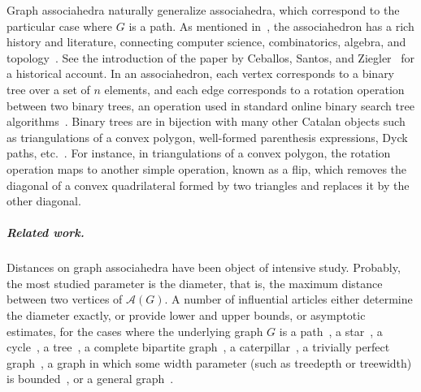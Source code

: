 \documentclass[a4paper,UKenglish,cleveref, autoref, thm-restate]{lipics-v2021}
\begin{document}
Graph associahedra naturally generalize
associahedra, which correspond to the particular case where $G$ is a path. As mentioned in~\cite{cardinal2022efficient},  the associahedron has a rich history and literature, connecting computer science, combinatorics, algebra, and topology~\cite{SleatorTT88,Loday04,HohlwegL07,Pournin14}. See the introduction of the paper by Ceballos, Santos,
and Ziegler~\cite{CeballosSZ15} for
a historical account. In an associahedron, each vertex corresponds to a binary tree over a set of $n$ elements, and each edge corresponds to a rotation operation between two binary trees, an operation used in standard online binary search tree algorithms~\cite{AVL-trees,GuibasS78,SleatorT85}. Binary trees are in bijection with many other Catalan objects such as triangulations of a convex polygon, well-formed parenthesis expressions, Dyck paths, etc.~\cite{Stanley15}. For instance, in triangulations of a convex polygon, the rotation operation maps to another simple operation, known as a flip, which removes the diagonal of a convex quadrilateral formed by two triangles and replaces it by the other diagonal.

\subparagraph*{Related work.}  Distances on graph associahedra have been object of intensive study. Probably, the most studied parameter is the diameter, that is, the maximum distance between two vertices of ${\mathcal A}(G)$. A number of influential articles either determine the diameter exactly, or provide lower and upper bounds, or asymptotic estimates, for the cases where the underlying graph $G$ is a path~\cite{SleatorTT88,Pournin14}, a
star~\cite{MannevilleP10}, a cycle~\cite{Pournin17}, a tree~\cite{MannevilleP10,CardinalLP18}, a complete bipartite graph~\cite{CardinalPVP22},
a caterpillar~\cite{Berendsohn22}, a
trivially perfect graph~\cite{CardinalPVP22},
a graph in which some width parameter (such as treedepth or treewidth) is bounded~\cite{CardinalPVP22}, or a general graph~\cite{MannevilleP10}.
\end{document}
